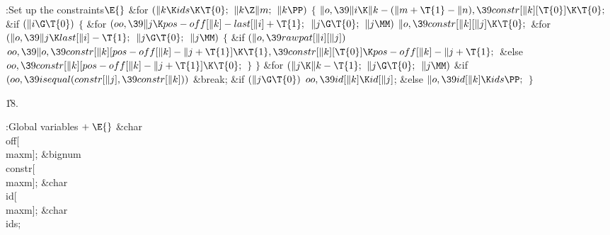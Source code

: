 \Y\B\4:Set up the constraints\X${}\E{}$\6
\&{for} ${}(\|k\K\\{ids}\K\T{0};{}$ ${}\|k\Z\|m;{}$ ${}\|k\PP){}$\5
${}\{{}$\1\6
${}\|o,\39\|i\K\|k-(\|m+\T{1}-\|n),\39\\{constr}[\|k][\T{0}]\K\T{0};{}$\6
\&{if} ${}(\|i\G\T{0}){}$\5
${}\{{}$\1\6
\&{for} ${}(\\{oo},\39\|j\K\\{pos}-\\{off}[\|k]-\\{last}[\|i]+\T{1};{}$ ${}\|j%
\G\T{0};{}$ ${}\|j\MM){}$\1\5
${}\|o,\39\\{constr}[\|k][\|j]\K\T{0};{}$\2\6
\&{for} ${}(\|o,\39\|j\K\\{last}[\|i]-\T{1};{}$ ${}\|j\G\T{0};{}$ ${}\|j\MM){}$%
\5
${}\{{}$\1\6
\&{if} ${}(\|o,\39\\{rawpat}[\|i][\|j]){}$\1\5
${}\\{oo},\39\|o,\39\\{constr}[\|k][\\{pos}-\\{off}[\|k]-\|j+\T{1}]\K\T{1},\39%
\\{constr}[\|k][\T{0}]\K\\{pos}-\\{off}[\|k]-\|j+\T{1};{}$\2\6
\&{else}\1\5
${}\\{oo},\39\\{constr}[\|k][\\{pos}-\\{off}[\|k]-\|j+\T{1}]\K\T{0};{}$\2\6
\4${}\}{}$\2\6
\4${}\}{}$\2\6
\&{for} ${}(\|j\K\|k-\T{1};{}$ ${}\|j\G\T{0};{}$ ${}\|j\MM){}$\1\6
\&{if} ${}(\\{oo},\39\\{isequal}(\\{constr}[\|j],\39\\{constr}[\|k])){}$\1\5
\&{break};\2\2\6
\&{if} ${}(\|j\G\T{0}){}$\1\5
${}\\{oo},\39\\{id}[\|k]\K\\{id}[\|j]{}$;\5
\2\&{else}\1\5
${}\|o,\39\\{id}[\|k]\K\\{ids}\PP;{}$\2\6
\4${}\}{}$\2\par
\U18.\fi

\B{}:Global variables\X${}\mathrel+\E{}$\6
\&{char} \\{off}[\\{maxm}];\6
\&{bignum} \\{constr}[\\{maxm}];\6
\&{char} \\{id}[\\{maxm}];%
\6
\&{char} \\{ids};\par
\fi

